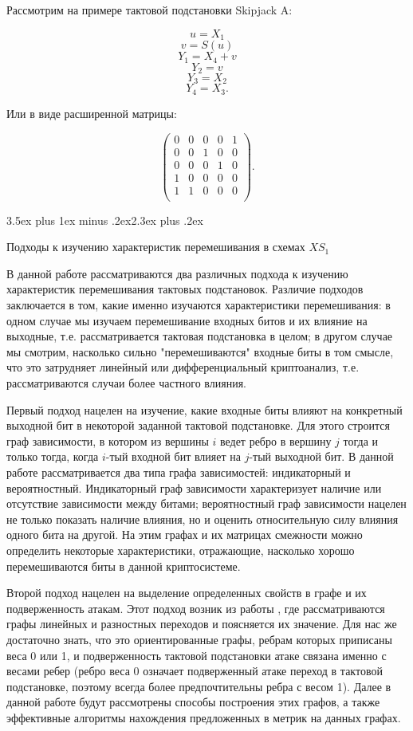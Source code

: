 \documentclass[a4paper,12pt]{report}
\makeatletter
\theoremstyle{plain} %
\theoremstyle{definition}
\theoremstyle{remark}
\renewcommand{\section}{\@startsection{section}{1}{18pt}%
{3.5ex plus 1ex minus .2ex}{2.3ex plus .2ex}%
{\normalfont\Large\bfseries\raggedright}}%
\makeatother
\begin{document}
\begin{large}
Рассмотрим на примере тактовой подстановки Skipjack A:

$$u = X_1$$
$$v = S(u)$$
$$Y_1 = X_4 + v$$
$$Y_2 = v$$
$$Y_3 = X_2$$
$$Y_4 = X_3.$$

Или в виде расширенной матрицы:

$$
\begin{pmatrix}
0 & 0 & 0 & 0 & 1\\
0 & 0 & 1 & 0 & 0\\
0 & 0 & 0 & 1 & 0\\
1 & 0 & 0 & 0 & 0\\
1    & 1    & 0 & 0    & 0\\
\end{pmatrix}.
$$

\section{Подходы к изучению характеристик перемешивания в схемах $XS_1$}

В данной работе рассматриваются два различных подхода к изучению характеристик перемешивания тактовых подстановок. Различие подходов заключается в том, какие именно изучаются характеристики перемешивания: в одном случае мы изучаем перемешивание входных битов и их влияние на выходные, т.е. рассматривается тактовая подстановка в целом; в другом случае мы смотрим, насколько сильно "перемешиваются" входные биты в том смысле, что это затрудняет линейный или дифференциальный криптоанализ, т.е. рассматриваются случаи более частного влияния.

Первый подход нацелен на изучение, какие входные биты влияют на конкретный выходной бит в некоторой заданной тактовой подстановке. Для этого строится граф зависимости, в котором из вершины $i$ ведет ребро в вершину $j$ тогда и только тогда, когда $i$-тый входной бит влияет на $j$-тый выходной бит. В данной работе рассматривается два типа графа зависимостей: индикаторный и вероятностный. Индикаторный граф зависимости характеризует наличие или отсутствие зависимости между битами; вероятностный граф зависимости нацелен не только показать наличие влияния, но и оценить относительную силу влияния одного бита на другой. На этим графах и их матрицах смежности можно определить некоторые характеристики, отражающие, насколько хорошо перемешиваются биты в данной криптосистеме.

Второй подход нацелен на выделение определенных свойств в графе и их подверженность атакам. Этот подход возник из работы \cite{marchuk}, где рассматриваются графы линейных и разностных переходов и поясняется их значение. Для нас же достаточно знать, что это ориентированные графы, ребрам которых приписаны веса 0 или 1, и подверженность тактовой подстановки атаке связана именно с весами ребер (ребро веса 0 означает подверженный атаке переход в тактовой подстановке, поэтому всегда более предпочтительны ребра с весом 1). Далее в данной работе будут рассмотрены способы построения этих графов, а также эффективные алгоритмы нахождения предложенных в \cite{marchuk} метрик на данных графах.


\end{large}
\end{document}
